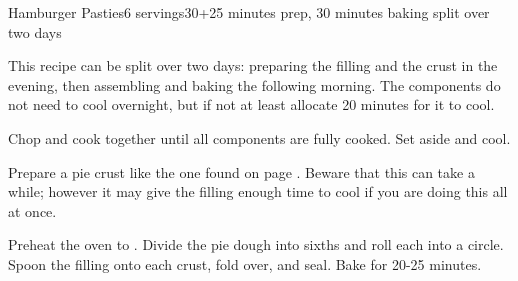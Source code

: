 \documentclass[../Cookbook.tex]{subfiles}
\begin{document}
\begin{recipe}{Hamburger Pasties}{6 servings}{30+25 minutes prep, 30 minutes baking split over two days}

This recipe can be split over two days: preparing the filling and the crust in the evening, then assembling and baking the following morning. The components do not need to cool overnight, but if not at least allocate 20 minutes for it to cool.

Chop and cook together until all components are fully cooked. Set aside and cool.

\newstep
Prepare a pie crust like the one found on page \pageref{PieCrust}. Beware that this can take a while; however it may give the filling enough time to cool if you are doing this all at once.

\newstep
Preheat the oven to .
Divide the pie dough into sixths and roll each into a circle. Spoon the filling onto each crust, fold over, and seal. Bake for 20-25 minutes.

\end{recipe}
\end{document}
